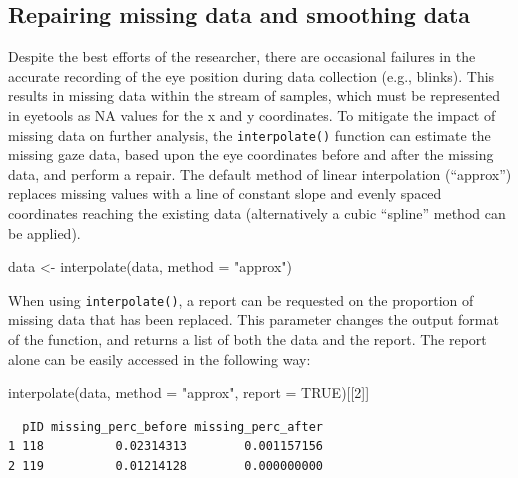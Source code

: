 \documentclass[
  man,
  floatsintext,
  longtable,
  nolmodern,
  notxfonts,
  notimes,
  colorlinks=true,linkcolor=blue,citecolor=blue,urlcolor=blue]{apa7}
\newenvironment{Shaded}{\begin{snugshade}}{\end{snugshade}}
\newcommand{\AttributeTok}[1]{\textcolor[rgb]{0.40,0.45,0.13}{#1}}
\newcommand{\ConstantTok}[1]{\textcolor[rgb]{0.56,0.35,0.01}{#1}}
\newcommand{\DecValTok}[1]{\textcolor[rgb]{0.68,0.00,0.00}{#1}}
\newcommand{\FunctionTok}[1]{\textcolor[rgb]{0.28,0.35,0.67}{#1}}
\newcommand{\NormalTok}[1]{\textcolor[rgb]{0.00,0.23,0.31}{#1}}
\newcommand{\OtherTok}[1]{\textcolor[rgb]{0.00,0.23,0.31}{#1}}
\newcommand{\StringTok}[1]{\textcolor[rgb]{0.13,0.47,0.30}{#1}}
\begin{document}
\subsection{Repairing missing data and smoothing
data}\label{repairing-missing-data-and-smoothing-data}

Despite the best efforts of the researcher, there are occasional
failures in the accurate recording of the eye position during data
collection (e.g., blinks). This results in missing data within the
stream of samples, which must be represented in eyetools as NA values
for the x and y coordinates. To mitigate the impact of missing data on
further analysis, the \texttt{interpolate()} function can estimate the
missing gaze data, based upon the eye coordinates before and after the
missing data, and perform a repair. The default method of linear
interpolation (``approx'') replaces missing values with a line of
constant slope and evenly spaced coordinates reaching the existing data
(alternatively a cubic ``spline'' method can be applied).

\begin{Shaded}
\begin{Highlighting}[]
\NormalTok{data }\OtherTok{\textless{}{-}} \FunctionTok{interpolate}\NormalTok{(data, }
                    \AttributeTok{method =} \StringTok{"approx"}\NormalTok{)}
\end{Highlighting}
\end{Shaded}

When using \texttt{interpolate()}, a report can be requested on the
proportion of missing data that has been replaced. This parameter
changes the output format of the function, and returns a list of both
the data and the report. The report alone can be easily accessed in the
following way:

\begin{Shaded}
\begin{Highlighting}[]
\FunctionTok{interpolate}\NormalTok{(data, }
            \AttributeTok{method =} \StringTok{"approx"}\NormalTok{, }
            \AttributeTok{report =} \ConstantTok{TRUE}\NormalTok{)[[}\DecValTok{2}\NormalTok{]]}
\end{Highlighting}
\end{Shaded}

\begin{verbatim}
  pID missing_perc_before missing_perc_after
1 118          0.02314313        0.001157156
2 119          0.01214128        0.000000000
\end{verbatim}
\end{document}
